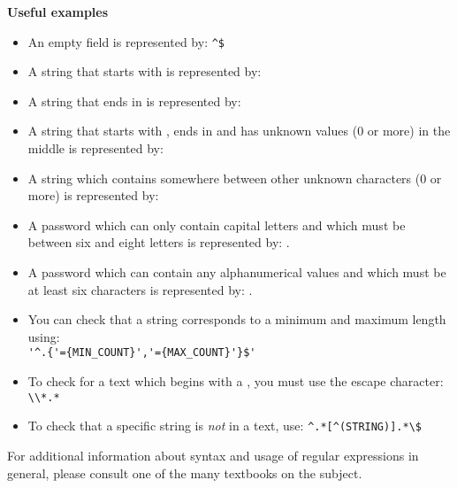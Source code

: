 \textbf{Useful examples}
\begin{itemize}
\item An empty field is represented by: \verb+^$+%
\item A string that starts with  is represented by: 
\item A string that ends in  is represented by: 
\item A string that starts with , ends in  and has unknown values (0 or more) in the middle is represented by: 
\item A string which contains  somewhere between other unknown characters (0 or more) is represented by: 
\item A password which can only contain capital letters and which must be between six and eight letters is represented by: .
\item A password which can contain any alphanumerical values and which must be at least six characters is represented by: .
\item You can check that a string corresponds to a minimum and maximum length using: \\
\verb#'^.{'={MIN_COUNT}','={MAX_COUNT}'}$'#
\item To check for a text which begins with a \bxshell{*}, you must use the escape character: \verb+\\*.*+
\item To check that a specific string is \textit{not} in a text, use: \verb+^.*[^(STRING)].*\$+
\end{itemize}


For additional information about syntax and usage of regular
expressions in general, please consult one
of the many textbooks on the subject.
